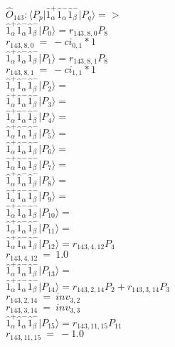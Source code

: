 \documentclass[14pt]{article}
\begin{document}
    $\hat{O}_{143}:  \langle{P_p}\vert \hat{1}_{\alpha}^{+}\hat{1}_{\alpha}^{-}\hat{1}_{\beta}^{-} \vert{P_q}\rangle => $ \\ 
    $ \hat{1}_{\alpha}^{+}\hat{1}_{\alpha}^{-}\hat{1}_{\beta}^{-} \vert{P_{0}}\rangle = {r}_{143,8,0}P_{8} $ \\ 
    ${r}_{143,8,0}\ =\ -{ci}_{0,1}*1 $ \\ 
    $ \hat{1}_{\alpha}^{+}\hat{1}_{\alpha}^{-}\hat{1}_{\beta}^{-} \vert{P_{1}}\rangle = {r}_{143,8,1}P_{8} $ \\ 
    ${r}_{143,8,1}\ =\ -{ci}_{1,1}*1 $ \\ 
    $ \hat{1}_{\alpha}^{+}\hat{1}_{\alpha}^{-}\hat{1}_{\beta}^{-} \vert{P_{2}}\rangle =  $ \\ 
    $ \hat{1}_{\alpha}^{+}\hat{1}_{\alpha}^{-}\hat{1}_{\beta}^{-} \vert{P_{3}}\rangle =  $ \\ 
    $ \hat{1}_{\alpha}^{+}\hat{1}_{\alpha}^{-}\hat{1}_{\beta}^{-} \vert{P_{4}}\rangle =  $ \\ 
    $ \hat{1}_{\alpha}^{+}\hat{1}_{\alpha}^{-}\hat{1}_{\beta}^{-} \vert{P_{5}}\rangle =  $ \\ 
    $ \hat{1}_{\alpha}^{+}\hat{1}_{\alpha}^{-}\hat{1}_{\beta}^{-} \vert{P_{6}}\rangle =  $ \\ 
    $ \hat{1}_{\alpha}^{+}\hat{1}_{\alpha}^{-}\hat{1}_{\beta}^{-} \vert{P_{7}}\rangle =  $ \\ 
    $ \hat{1}_{\alpha}^{+}\hat{1}_{\alpha}^{-}\hat{1}_{\beta}^{-} \vert{P_{8}}\rangle =  $ \\ 
    $ \hat{1}_{\alpha}^{+}\hat{1}_{\alpha}^{-}\hat{1}_{\beta}^{-} \vert{P_{9}}\rangle =  $ \\ 
    $ \hat{1}_{\alpha}^{+}\hat{1}_{\alpha}^{-}\hat{1}_{\beta}^{-} \vert{P_{10}}\rangle =  $ \\ 
    $ \hat{1}_{\alpha}^{+}\hat{1}_{\alpha}^{-}\hat{1}_{\beta}^{-} \vert{P_{11}}\rangle =  $ \\ 
    $ \hat{1}_{\alpha}^{+}\hat{1}_{\alpha}^{-}\hat{1}_{\beta}^{-} \vert{P_{12}}\rangle = {r}_{143,4,12}P_{4} $ \\ 
    ${r}_{143,4,12}\ =\ 1.0 $ \\ 
    $ \hat{1}_{\alpha}^{+}\hat{1}_{\alpha}^{-}\hat{1}_{\beta}^{-} \vert{P_{13}}\rangle =  $ \\ 
    $ \hat{1}_{\alpha}^{+}\hat{1}_{\alpha}^{-}\hat{1}_{\beta}^{-} \vert{P_{14}}\rangle = {r}_{143,2,14}P_{2}+{r}_{143,3,14}P_{3} $ \\ 
    ${r}_{143,2,14}\ =\ {inv}_{3,2} $ \\ 
    ${r}_{143,3,14}\ =\ {inv}_{3,3} $ \\ 
    $ \hat{1}_{\alpha}^{+}\hat{1}_{\alpha}^{-}\hat{1}_{\beta}^{-} \vert{P_{15}}\rangle = {r}_{143,11,15}P_{11} $ \\ 
    ${r}_{143,11,15}\ =\ -1.0 $ \\ 
    
\end{document}

